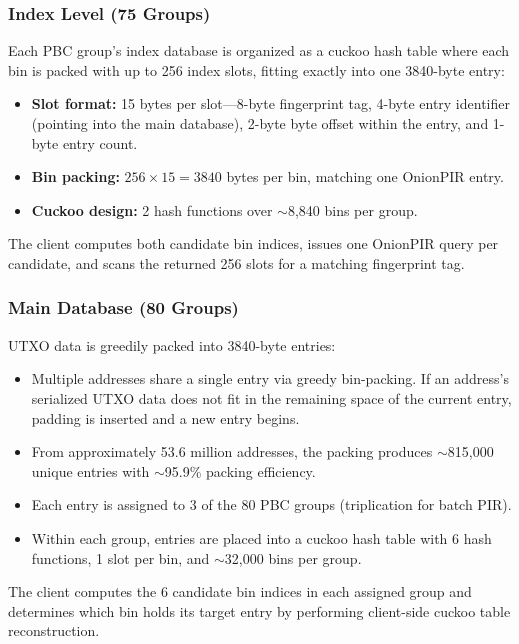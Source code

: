 \subsubsection{Index Level (75 Groups)}

Each PBC group's index database is organized as a cuckoo hash table where each bin is packed with up to 256 index slots, fitting exactly into one 3840-byte entry:
\begin{itemize}[nolistsep,leftmargin=*]
    \item \textbf{Slot format:} 15 bytes per slot---8-byte fingerprint tag, 4-byte entry identifier (pointing into the main database), 2-byte byte offset within the entry, and 1-byte entry count.
    \item \textbf{Bin packing:} $256 \times 15 = 3840$ bytes per bin, matching one OnionPIR entry.
    \item \textbf{Cuckoo design:} 2 hash functions over $\sim$8,840 bins per group.
\end{itemize}

The client computes both candidate bin indices, issues one OnionPIR query per candidate, and scans the returned 256 slots for a matching fingerprint tag.

\subsubsection{Main Database (80 Groups)}

UTXO data is greedily packed into 3840-byte entries:
\begin{itemize}[nolistsep,leftmargin=*]
    \item Multiple addresses share a single entry via greedy bin-packing. If an address's serialized UTXO data does not fit in the remaining space of the current entry, padding is inserted and a new entry begins.
    \item From approximately 53.6 million addresses, the packing produces $\sim$815,000 unique entries with $\sim$95.9\% packing efficiency.
    \item Each entry is assigned to 3 of the 80 PBC groups (triplication for batch PIR).
    \item Within each group, entries are placed into a cuckoo hash table with 6 hash functions, 1 slot per bin, and $\sim$32,000 bins per group.
\end{itemize}

The client computes the 6 candidate bin indices in each assigned group and determines which bin holds its target entry by performing client-side cuckoo table reconstruction.

